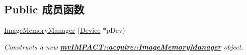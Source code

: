\subsection*{Public 成员函数}
\begin{DoxyCompactItemize}
\item 
\hyperlink{classmv_i_m_p_a_c_t_1_1acquire_1_1_image_memory_manager_a332c46fc70ec6e91eedfbd8b81712354}{Image\+Memory\+Manager} (\hyperlink{classmv_i_m_p_a_c_t_1_1acquire_1_1_device}{Device} $\ast$p\+Dev)
\begin{DoxyCompactList}\small\item\em Constructs a new {\bfseries \hyperlink{classmv_i_m_p_a_c_t_1_1acquire_1_1_image_memory_manager}{mv\+I\+M\+P\+A\+C\+T\+::acquire\+::\+Image\+Memory\+Manager}} object. \end{DoxyCompactList}\end{DoxyCompactItemize}
